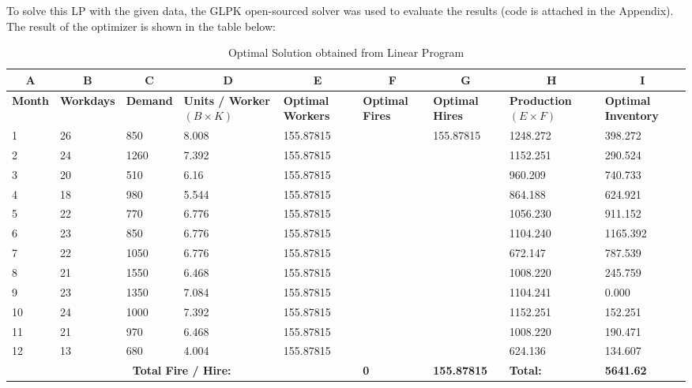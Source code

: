 \documentclass[12pt]{article}
\begin{document}
\noindent To solve this LP with the given data, the GLPK open-sourced solver was used to evaluate the results (code is attached in the Appendix). The result of the optimizer is shown in the table below:

\begin{table}[H]
    \centering
    \begin{adjustbox}{width=\textwidth}
    \begin{tabular}{|l||l|p{1.8cm}|p{1.8cm}|p{1.8cm}|p{1.8cm}|p{2.2cm}|p{1.8cm}|p{2.2cm}|}
    \hline
    \multicolumn{1}{|c||}{\textbf{A}} & \multicolumn{1}{c}{\textbf{B}}& \multicolumn{1}{|c}{\textbf{C}}& \multicolumn{1}{|c}{\textbf{D}}& \multicolumn{1}{|c}{\textbf{E}}& \multicolumn{1}{|c}{\textbf{F}}& \multicolumn{1}{|c}{\textbf{G}}& \multicolumn{1}{|c}{\textbf{H}}&\multicolumn{1}{|c|}{\textbf{I}} \\ \hline \hline 
        \textbf{Month} & \textbf{Workdays} & \textbf{Demand} & \textbf{Units / Worker $(B \times K)$} & \textbf{Optimal Workers} & \textbf{Optimal Fires} & \textbf{Optimal Hires} & \textbf{Production $(E\times F)$} & \textbf{Optimal Inventory} \\ \hline
        1 & 26 & 850 & 8.008 & 155.87815 & ~ & 155.87815 & 1248.272 & 398.272 \\ \hline
        2 & 24 & 1260& 7.392 & 155.87815 & ~ & ~ & 1152.251 & 290.524 \\ \hline
        3 & 20 & 510 & 6.16 & 155.87815 & ~ & ~ & 960.209 & 740.733 \\ \hline
        4 & 18 & 980 & 5.544 & 155.87815 & ~ & ~ & 864.188 & 624.921 \\ \hline
        5 & 22 & 770 & 6.776 & 155.87815 & ~ & ~ & 1056.230 & 911.152 \\ \hline
        6 & 23 & 850 & 6.776 & 155.87815 & ~ & ~ & 1104.240 & 1165.392 \\ \hline
        7 & 22 & 1050 & 6.776 & 155.87815 & ~ & ~ & 672.147 & 787.539 \\ \hline
        8 & 21 & 1550 & 6.468 & 155.87815 & ~ & ~ & 1008.220 & 245.759 \\ \hline
        9 & 23 & 1350 & 7.084 & 155.87815 & ~ & ~ & 1104.241 & 0.000 \\ \hline
        10 & 24 & 1000 & 7.392 & 155.87815 & ~ & ~ & 1152.251 & 152.251 \\ \hline
        11 & 21 & 970 & 6.468 & 155.87815 & ~ & ~ & 1008.220 & 190.471 \\ \hline
        12 & 13 & 680& 4.004 & 155.87815 & ~ & ~ & 624.136 & 134.607 \\ \hline \hline 
        \multicolumn{5}{|c|}{\textbf{Total Fire / Hire:}} & \textbf{0} & \textbf{155.87815} & \multicolumn{1}{||p{2.3cm}|}{\textbf{Total:}} & \textbf{5641.62} \\ \hline
    \end{tabular}
    \end{adjustbox}
    \caption{Optimal Solution obtained from Linear Program}
    \label{tab:1c-lp}
\end{table} 
\end{document}
